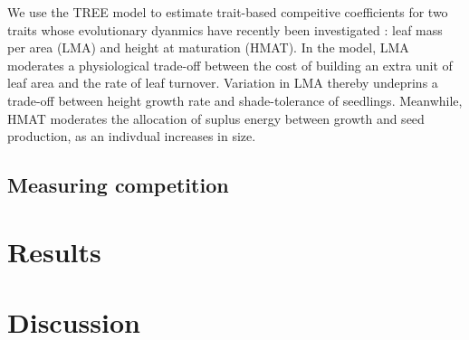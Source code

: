 \documentclass[a4paper,11pt]{article}
\begin{document}
We use the TREE model to estimate trait-based compeitive coefficients for
two traits whose evolutionary dyanmics have recently been investigated
\citet{Falster-2015}: leaf mass per area (LMA) and height at maturation
(HMAT). In the model, LMA moderates a physiological trade-off between the cost
of building an extra unit of leaf area and the rate of leaf turnover.
Variation in LMA thereby undeprins a trade-off between height growth rate and
shade-tolerance of seedlings. Meanwhile, HMAT moderates the allocation of
suplus energy between growth and seed production, as an indivdual increases in
size.

\subsection{Measuring competition}



\clearpage

\section{Results}

\clearpage
\section{Discussion}
\end{document}

